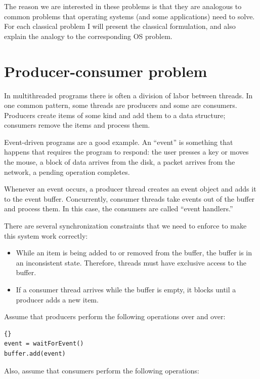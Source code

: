 \documentclass{book}
\begin{document}
The reason we are interested in these problems
is that they are analogous to common problems that operating
systems (and some applications) need to solve.  For each classical
problem I will present the classical formulation, and also explain
the analogy to the corresponding OS problem.


\section{Producer-consumer problem}

In multithreaded programs there is often a division of labor between
threads.  In one common pattern, some threads are producers and some
are consumers.  Producers create items of some kind and add them to a
data structure; consumers remove the items and process them.

Event-driven programs are a good example.  An ``event'' is something
that happens that requires the program to respond: the user presses a
key or moves the mouse, a block of data arrives from the disk, a
packet arrives from the network, a pending operation completes.

Whenever an event occurs, a producer thread creates an event
object and adds it to the event buffer.  Concurrently, consumer
threads take events out of the buffer and process them.
In this case, the consumers are called ``event handlers.''

There are several synchronization constraints that we need to
enforce to make this system work correctly:

\begin{itemize}

\item While an item is being added to or removed from the buffer,
the buffer is in an inconsistent state.  Therefore, threads must
have exclusive access to the buffer.

\item If a consumer thread arrives while the buffer is empty, it
blocks until a producer adds a new item.

\end{itemize}

Assume that producers perform the following operations over and
over:

\begin{lstlisting}[caption={Basic producer code}]{}
event = waitForEvent()
buffer.add(event)
\end{lstlisting}

Also, assume that consumers perform the following operations:
\end{document}
